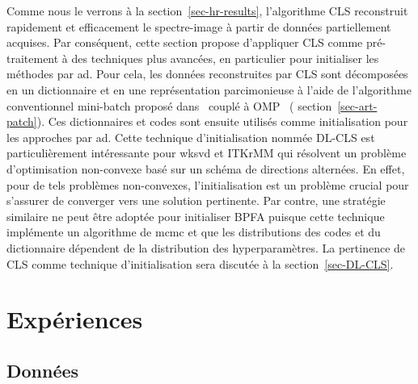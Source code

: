 Comme nous le verrons à la section~\ref{sec-hr-results}, l'algorithme CLS reconstruit rapidement et efficacement le spectre-image à partir de données partiellement acquises. Par conséquent, cette section propose d'appliquer CLS comme pré-traitement à des techniques plus avancées, en particulier pour initialiser les méthodes par \gls{ad}. Pour cela, les données reconstruites par CLS sont décomposées en un dictionnaire et en une représentation parcimonieuse à l'aide de l'algorithme conventionnel mini-batch proposé dans~\cite{mairal2009online} couplé à OMP~\cite{mallat1993matching, pati1993orthogonal} (\cf{} section~\ref{sec-art-patch}). Ces dictionnaires et codes sont ensuite utilisés comme initialisation pour les approches par \gls{ad}.
%
Cette technique d'initialisation nommée DL-CLS est particulièrement intéressante pour \gls{wksvd} et ITKrMM qui résolvent un problème d'optimisation non-convexe basé sur un schéma de directions alternées. En effet, pour de tels problèmes non-convexes, l'initialisation est un problème crucial pour s'assurer de converger vers une solution pertinente.
%
Par contre, une stratégie similaire ne peut être adoptée pour initialiser BPFA puisque cette technique implémente un algorithme de \gls{mcmc} et que les distributions des codes et du dictionnaire dépendent de la distribution des hyperparamètres.
%
La pertinence de CLS comme technique d'initialisation sera discutée à la section~\ref{sec-DL-CLS}.

%
\section{Expériences}\label{sec-experiments-hr}

\subsection{Données}\label{sec-donnees-hr}

